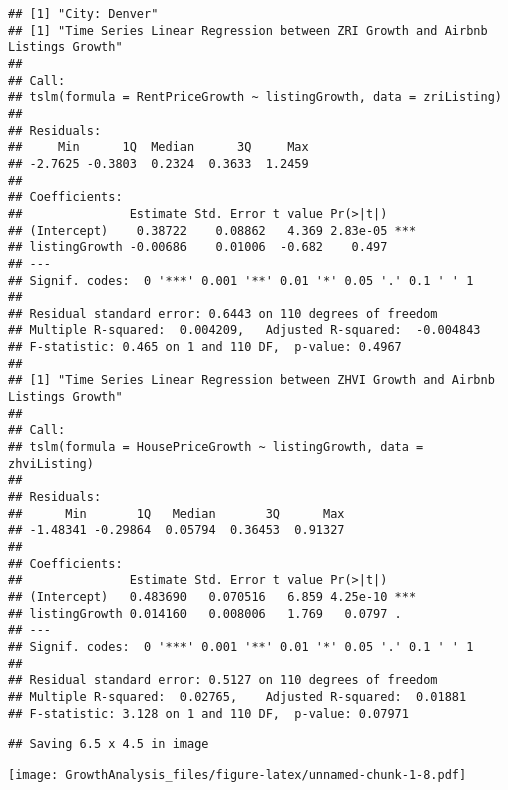 \documentclass[
]{article}
\begin{document}
\begin{verbatim}
## [1] "City: Denver"
## [1] "Time Series Linear Regression between ZRI Growth and Airbnb Listings Growth"
## 
## Call:
## tslm(formula = RentPriceGrowth ~ listingGrowth, data = zriListing)
## 
## Residuals:
##     Min      1Q  Median      3Q     Max 
## -2.7625 -0.3803  0.2324  0.3633  1.2459 
## 
## Coefficients:
##               Estimate Std. Error t value Pr(>|t|)    
## (Intercept)    0.38722    0.08862   4.369 2.83e-05 ***
## listingGrowth -0.00686    0.01006  -0.682    0.497    
## ---
## Signif. codes:  0 '***' 0.001 '**' 0.01 '*' 0.05 '.' 0.1 ' ' 1
## 
## Residual standard error: 0.6443 on 110 degrees of freedom
## Multiple R-squared:  0.004209,   Adjusted R-squared:  -0.004843 
## F-statistic: 0.465 on 1 and 110 DF,  p-value: 0.4967
## 
## [1] "Time Series Linear Regression between ZHVI Growth and Airbnb Listings Growth"
## 
## Call:
## tslm(formula = HousePriceGrowth ~ listingGrowth, data = zhviListing)
## 
## Residuals:
##      Min       1Q   Median       3Q      Max 
## -1.48341 -0.29864  0.05794  0.36453  0.91327 
## 
## Coefficients:
##               Estimate Std. Error t value Pr(>|t|)    
## (Intercept)   0.483690   0.070516   6.859 4.25e-10 ***
## listingGrowth 0.014160   0.008006   1.769   0.0797 .  
## ---
## Signif. codes:  0 '***' 0.001 '**' 0.01 '*' 0.05 '.' 0.1 ' ' 1
## 
## Residual standard error: 0.5127 on 110 degrees of freedom
## Multiple R-squared:  0.02765,    Adjusted R-squared:  0.01881 
## F-statistic: 3.128 on 1 and 110 DF,  p-value: 0.07971
\end{verbatim}

\begin{verbatim}
## Saving 6.5 x 4.5 in image
\end{verbatim}

\texttt{[image: GrowthAnalysis\_files/figure-latex/unnamed-chunk-1-8.pdf]}
\end{document}
